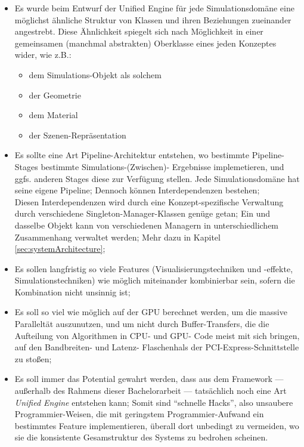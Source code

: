 \begin{itemize}
	\item Es wurde beim Entwurf der Unified Engine für jede Simulationsdomäne eine möglichst ähnliche Struktur von Klassen 	
	und ihren Beziehungen zueinander angestrebt. Diese Ähnlichkeit spiegelt sich nach Möglichkeit in einer gemeinsamen 	
	(manchmal abstrakten) Oberklasse eines jeden Konzeptes wider, wie z.B.:
	\begin{itemize}
		\item dem Simulations-Objekt als solchem
		\item der Geometrie
		\item dem Material
		\item der Szenen-Repräsentation
	\end{itemize}

	\item Es sollte eine Art Pipeline-Architektur entstehen, wo bestimmte Pipeline-Stages bestimmte Simulations-(Zwischen)-
	Ergebnisse implemetieren, und ggfs. anderen Stages diese zur Verfügung stellen. Jede Simulationsdomäne hat seine eigene 
	Pipeline; Dennoch können Interdependenzen bestehen;\\
	Diesen Interdependenzen wird durch eine Konzept-spezifische Verwaltung durch verschiedene Singleton-Manager-Klassen 	
	genüge getan; Ein und dasselbe Objekt kann von verschiedenen Managern in unterschiedlichem Zusammenhang verwaltet 
	werden; Mehr dazu in Kapitel \ref{sec:systemArchitecture};

	\item Es sollen langfristig so viele Features (Visualisierungstechniken und -effekte, Simulationstechniken) wie möglich 
	miteinander kombinierbar sein, sofern die Kombination nicht unsinnig ist;

	\item Es soll so viel wie möglich auf der GPU berechnet werden, um die massive Paralleltät auszunutzen, 
	und um nicht durch Buffer-Transfers, die die Aufteilung von Algorithmen in CPU- und GPU- Code meist mit sich bringen, 	
	auf den Bandbreiten- und Latenz- Flaschenhals der PCI-Express-Schnittstelle zu stoßen;
	
	\item Es soll immer das Potential gewahrt werden, dass aus dem Framework --- außerhalb des Rahmens dieser 
	Bachelorarbeit --- tatsächlich noch eine Art \emph{Unified Engine} entstehen kann; Somit sind "`schnelle Hacks"',
	also unsaubere Programmier-Weisen, die mit geringstem Programmier-Aufwand ein bestimmtes Feature implementieren,
	überall dort unbedingt zu vermeiden, wo sie die konsistente Gesamstruktur des Systems zu bedrohen scheinen.

\end{itemize}



